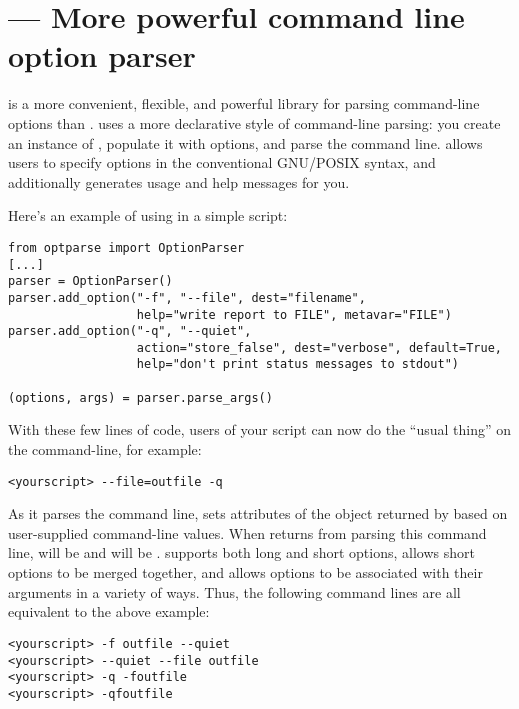 \section{ --- More powerful command line option parser}

 is a more convenient, flexible, and powerful library for
parsing command-line options than .   uses a more
declarative style of command-line parsing: you create an instance of
, populate it with options, and parse the command line.
 allows users to specify options in the conventional GNU/POSIX
syntax, and additionally generates usage and help messages for you.

Here's an example of using  in a simple script:
\begin{verbatim}
from optparse import OptionParser
[...]
parser = OptionParser()
parser.add_option("-f", "--file", dest="filename",
                  help="write report to FILE", metavar="FILE")
parser.add_option("-q", "--quiet",
                  action="store_false", dest="verbose", default=True,
                  help="don't print status messages to stdout")

(options, args) = parser.parse_args()
\end{verbatim}

With these few lines of code, users of your script can now do the
``usual thing'' on the command-line, for example:
\begin{verbatim}
<yourscript> --file=outfile -q
\end{verbatim}

As it parses the command line,  sets attributes of the
 object returned by  based on user-supplied
command-line values.  When  returns from parsing this
command line,  will be  and
 will be .   supports both long
and short options, allows short options to be merged together, and
allows options to be associated with their arguments in a variety of
ways.  Thus, the following command lines are all equivalent to the above
example:
\begin{verbatim}
<yourscript> -f outfile --quiet
<yourscript> --quiet --file outfile
<yourscript> -q -foutfile
<yourscript> -qfoutfile
\end{verbatim}

